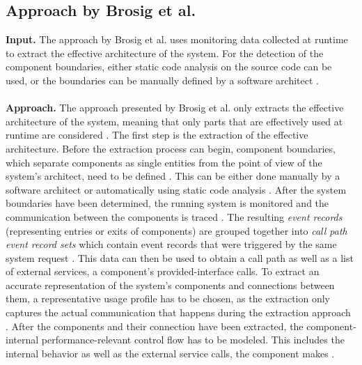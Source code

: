\subsection{Approach by Brosig et al.}
\label{sec:Results:Brosig}
\textbf{Input.}
The approach by Brosig et al. uses monitoring data collected at runtime to extract the effective architecture \cite{Israr2007interaction} of the system.
For the detection of the component boundaries, either static code analysis on the source code can be used, or the boundaries can be manually defined by a software architect \cite{Brosig2011}.
\\ \\
\textbf{Approach.}
The approach presented by Brosig et al. only extracts the effective architecture \cite{Israr2007interaction} of the system, meaning that only parts that are effectively used at runtime are considered \cite{Brosig2011}.
The first step is the extraction of the effective architecture.
Before the extraction process can begin, component boundaries, which separate components as single entities from the point of view of the system's architect, need to be defined \cite{Brosig2011}.
This can be either done manually by a software architect or automatically using static code analysis \cite{Brosig2011}.
After the system boundaries have been determined, the running system is monitored and the communication between the components is traced \cite{Brosig2011}.
The resulting \textit{event records} (representing entries or exits of components) are grouped together into \textit{call path event record sets} which contain event records that were triggered by the same system request \cite{Brosig2011}.
This data can then be used to obtain a call path \cite{Brosig2011} as well as a list of external services, a component's provided-interface calls.
To extract an accurate representation of the system's components and connections between them, a representative usage profile has to be chosen, as the extraction only captures the actual communication that happens during the extraction approach \cite{Brosig2011}.
After the components and their connection have been extracted, the component-internal performance-relevant control flow has to be modeled.
This includes the internal behavior as well as the external service calls, the component makes \cite{Brosig2011}.

